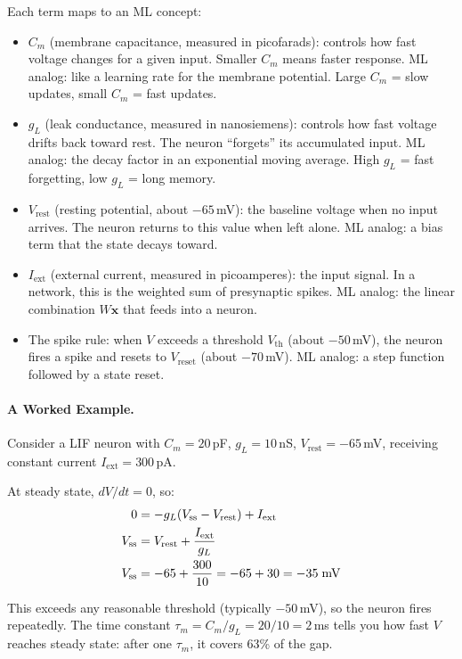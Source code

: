 \documentclass[11pt,a4paper]{article}
\begin{document}
Each term maps to an ML concept:
\begin{itemize}
  \item $C_m$ (membrane capacitance, measured in picofarads): controls how fast voltage changes for a given input. Smaller $C_m$ means faster response. ML analog: like a learning rate for the membrane potential. Large $C_m$ = slow updates, small $C_m$ = fast updates.
  \item $g_L$ (leak conductance, measured in nanosiemens): controls how fast voltage drifts back toward rest. The neuron ``forgets'' its accumulated input. ML analog: the decay factor in an exponential moving average. High $g_L$ = fast forgetting, low $g_L$ = long memory.
  \item $V_{\mathrm{rest}}$ (resting potential, about $-65$\,mV): the baseline voltage when no input arrives. The neuron returns to this value when left alone. ML analog: a bias term that the state decays toward.
  \item $I_{\mathrm{ext}}$ (external current, measured in picoamperes): the input signal. In a network, this is the weighted sum of presynaptic spikes. ML analog: the linear combination $W \mathbf{x}$ that feeds into a neuron.
  \item The spike rule: when $V$ exceeds a threshold $V_{\mathrm{th}}$ (about $-50$\,mV), the neuron fires a spike and resets to $V_{\mathrm{reset}}$ (about $-70$\,mV). ML analog: a step function followed by a state reset.
\end{itemize}

\paragraph{A Worked Example.}

Consider a LIF neuron with $C_m = 20$\,pF, $g_L = 10$\,nS, $V_{\mathrm{rest}} = -65$\,mV, receiving constant current $I_{\mathrm{ext}} = 300$\,pA.

At steady state, $dV/dt = 0$, so:
\begin{align}
  0 &= -g_L(V_{\mathrm{ss}} - V_{\mathrm{rest}}) + I_{\mathrm{ext}} \notag\\
  V_{\mathrm{ss}} &= V_{\mathrm{rest}} + \frac{I_{\mathrm{ext}}}{g_L} \notag\\
  V_{\mathrm{ss}} &= -65 + \frac{300}{10} = -65 + 30 = -35\;\text{mV} \notag
\end{align}

This exceeds any reasonable threshold (typically $-50$\,mV), so the neuron fires repeatedly. The time constant $\tau_m = C_m / g_L = 20/10 = 2$\,ms tells you how fast $V$ reaches steady state: after one $\tau_m$, it covers 63\% of the gap.
\end{document}
